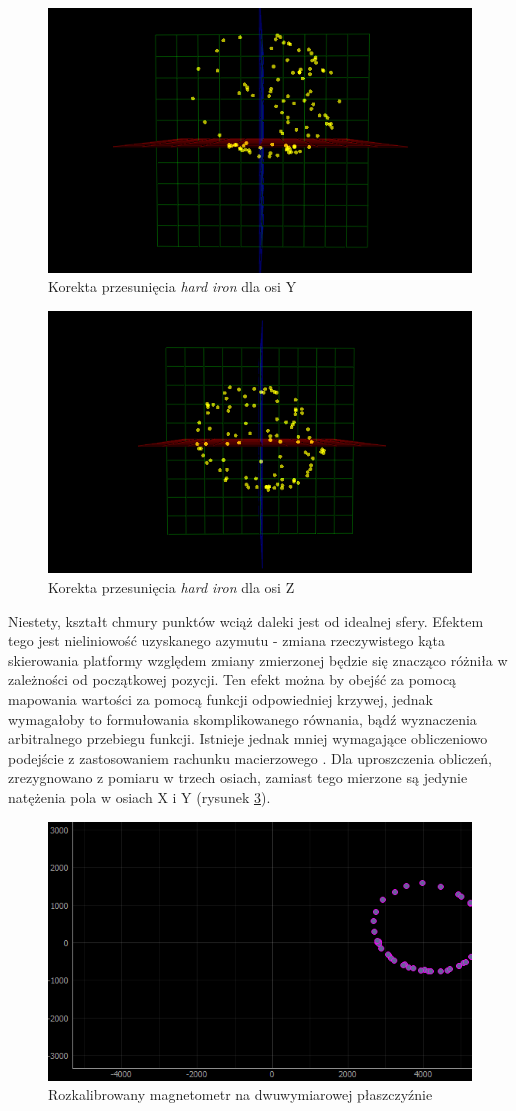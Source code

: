 \begin{figure}[H]
	\centering
		\includegraphics[width=0.6\linewidth]{rys/ScanBot-05-magnetometer-3d-calibration.PNG}
	\caption{Korekta przesunięcia \emph{hard iron} dla osi Y}
	\label{fig:3d-mag-hard-corr-y}
\end{figure}

\begin{figure}[H]
	\centering
		\includegraphics[width=0.6\linewidth]{rys/ScanBot-06-magnetometer-3d-calibration.PNG}
	\caption{Korekta przesunięcia \emph{hard iron} dla osi Z}
	\label{fig:3d-mag-hard-corr-z}
\end{figure}

Niestety, kształt chmury punktów wciąż daleki jest od idealnej sfery. Efektem tego jest nieliniowość uzyskanego azymutu - zmiana rzeczywistego kąta skierowania platformy względem zmiany zmierzonej będzie się znacząco różniła w zależności od początkowej pozycji. Ten efekt można by obejść za pomocą mapowania wartości za pomocą funkcji odpowiedniej krzywej, jednak wymagałoby to formułowania skomplikowanego równania, bądź wyznaczenia arbitralnego przebiegu funkcji. Istnieje jednak mniej wymagające obliczeniowo podejście z zastosowaniem rachunku macierzowego \cite{hard-soft-iron}. Dla uproszczenia obliczeń, zrezygnowano z pomiaru w trzech osiach, zamiast tego mierzone są jedynie natężenia pola w osiach X i Y (rysunek \ref{fig:2d-mag-no-cal}).

\begin{figure}[H]
	\centering
		\includegraphics[width=0.6\linewidth]{rys/ScanBot-08-2d-calibration-theta-sigma.PNG}
	\caption{Rozkalibrowany magnetometr na dwuwymiarowej płaszczyźnie}
	\label{fig:2d-mag-no-cal}
\end{figure}

